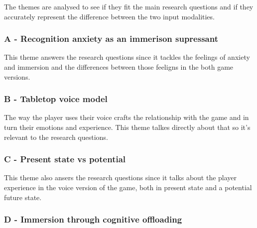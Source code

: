 The themes are analysed to see if they fit the main research questions and if they accurately represent the difference between the two input modalities.


\subsubsection{A - Recognition anxiety as an immerison supressant}


This theme answers the research questions since it tackles the feelings of anxiety and immersion and the differences between those feeligns in the both game versions.


\subsubsection{B - Tabletop voice model}

The way the player uses their voice crafts the relationship with the game and in turn their emotions and experience. This theme talkes directly about that so it's relevant to the research questions.

\subsubsection{C - Present state vs potential}


This theme also ansers the research questions since it talks about the player experience in the voice version of the game, both in present state and a potential future state.

\subsubsection{D - Immersion through cognitive offloading}

